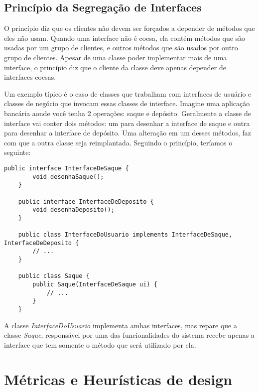 \subsection{Princípio da Segregação de Interfaces}
\label{subsec:isp}

O princípio diz que os clientes não devem ser forçados a depender de métodos que eles não usam. Quando uma interface não é coesa,
ela contém métodos que são usadas por um grupo de clientes, e outros métodos que são usados por outro grupo de clientes. Apesar de uma
classe poder implementar mais de uma interface, o princípio diz que o cliente da classe deve apenas depender de interfaces
coesas.

Um exemplo típico é o caso de classes que trabalham com interfaces de usuário e classes de negócio que invocam essas classes
de interface. Imagine uma aplicação bancária aonde você tenha 2 operações: saque e depósito. Geralmente a classe de interface 
vai conter dois métodos: um para desenhar a interface de saque e outra para desenhar a interface de depósito. Uma alteração em
um desses métodos, faz com que a outra classe seja reimplantada. Seguindo o princípio, teríamos o seguinte:

\begin{lstlisting}[frame=trbl]
	public interface InterfaceDeSaque {
		void desenhaSaque();
	}
	
	public interface InterfaceDeDeposito {
		void desenhaDeposito();
	}
	
	public class InterfaceDoUsuario implements InterfaceDeSaque, InterfaceDeDeposito {
		// ...
	}
	
	public class Saque {
		public Saque(InterfaceDeSaque ui) { 
			// ...
		}
	}
\end{lstlisting}

A classe \textit{InterfaceDoUsuario} implementa ambas interfaces, mas repare que a classe \textit{Saque}, responsável por
uma das funcionalidades do sistema recebe apenas a interface que tem somente o método que será utilizado por ela.

\section{Métricas e Heurísticas de design}

